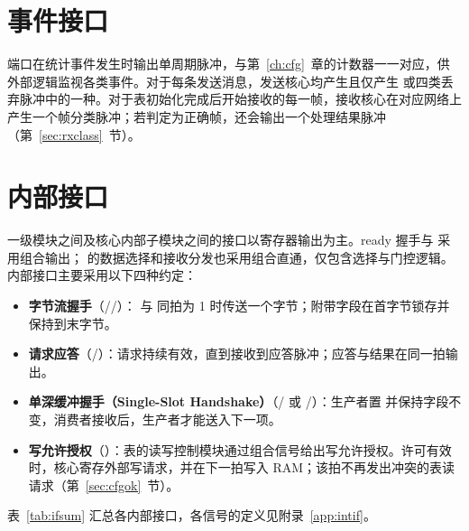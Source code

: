 \section{事件接口}

 端口在统计事件发生时输出单周期脉冲，与第~\ref{ch:cfg}~章的计数器一一对应，供外部逻辑监视各类事件。对于每条发送消息，发送核心均产生且仅产生  或四类丢弃脉冲中的一种。对于表初始化完成后开始接收的每一帧，接收核心在对应网络上产生一个帧分类脉冲；若判定为正确帧，还会输出一个处理结果脉冲（第~\ref{sec:rxclass}~节）。

\section{内部接口}\label{sec:intif}

一级模块之间及核心内部子模块之间的接口以寄存器输出为主。ready 握手与  采用组合输出； 的数据选择和接收分发也采用组合直通，仅包含选择与门控逻辑。内部接口主要采用以下四种约定：
\begin{itemize}
  \item \textbf{字节流握手}（//）： 与  同拍为 1 时传送一个字节；附带字段在首字节锁存并保持到末字节。
  \item \textbf{请求应答}（/）：请求持续有效，直到接收到应答脉冲；应答与结果在同一拍输出。
  \item \textbf{单深缓冲握手（Single-Slot Handshake）}（/ 或 /）：生产者置  并保持字段不变，消费者接收后，生产者才能送入下一项。
  \item \textbf{写允许授权}（）：表的读写控制模块通过组合信号给出写允许授权。许可有效时，核心寄存外部写请求，并在下一拍写入 RAM；该拍不再发出冲突的表读请求（第~\ref{sec:cfgok}~节）。
\end{itemize}

表~\ref{tab:ifsum} 汇总各内部接口，各信号的定义见附录~\ref{app:intif}。

